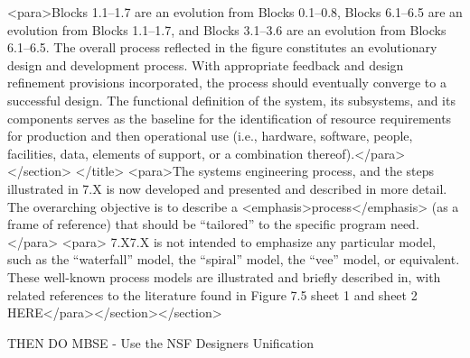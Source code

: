 <para>Blocks 1.1–1.7 are an evolution from Blocks 0.1–0.8, Blocks 6.1–6.5 are an evolution from Blocks 1.1–1.7, and Blocks 3.1–3.6 are an evolution from Blocks 6.1–6.5. The overall process reflected in the figure constitutes an evolutionary design and development process. With appropriate feedback and design refinement provisions incorporated, the process should eventually converge to a successful design. The functional definition of the system, its subsystems, and its components serves as the baseline for the identification of resource requirements for production and then operational use (i.e., hardware, software, people, facilities, data, elements of support, or a combination thereof).</para></section>
</title>
	<para>The systems engineering process, and the steps illustrated in 7.X is now developed and presented and described in more detail. The overarching objective is to describe a <emphasis>process</emphasis> (as a frame of reference) that should be “tailored” to the specific program need.</para>
<para> 7.X7.X is not intended to emphasize any particular model, such as the “waterfall” model, the “spiral” model, the “vee” model, or equivalent. These well-known process models are illustrated and briefly described in, with related references to the literature found in
Figure 7.5 sheet 1 and sheet 2 HERE</para></section></section>

THEN DO MBSE - Use the NSF Designers Unification
